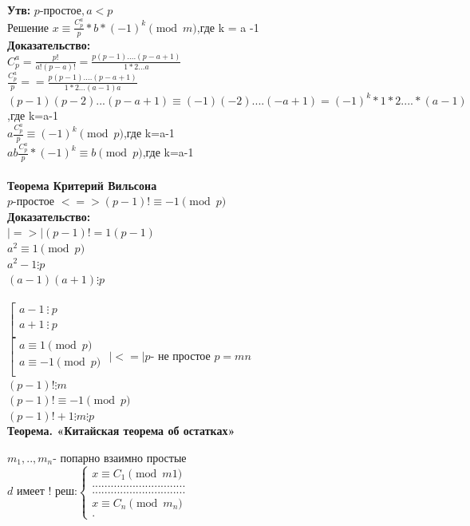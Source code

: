 \documentclass[12pt]{article}
\begin{document}
    \textbf{Утв:}
$p$-простое$ , a<p $\\
    Решение  $x\equiv \frac{C_p^a}{p}*b*(-1)^k \pmod{m}$,где k = a -1\\
    \textbf{Доказательство:}\\
$ C_p^a = \frac{p!}{a!(p-a)!}=\frac{p(p-1)....(p-a+1)}{1*2...a} $\\
$\frac{C_p^a}{p}= =\frac{p(p-1)....(p-a+1)}{1*2...(a-1)a}$\\
$(p-1)(p-2)...(p-a+1)\equiv (-1)(-2)....(-a+1) = (-1)^k*1*2....*(a-1)$,где k=a-1\\
$a\frac{C_p^a}{p}\equiv (-1)^k \pmod{p}$,где k=a-1\\
$ab\frac{C_p^a}{p} * (-1)^k\equiv b \pmod{p} $,где k=a-1\\
    \\
    \textbf{Теорема Критерий Вильсона}
    \\
$p$-простое $<=> (p-1)! \equiv -1 \pmod{p} $\\
    \textbf{Доказательство:}\\
$|=>|  (p-1)!= 1(p-1) $\\
$a^2 \equiv 1 \pmod{p}$\\
$a^2 -1 \vdots p$\\
$(a-1)(a+1) \vdots p$\\
    \\
$\left[ \begin{array}{l}
    a-1 \ \vdots\ p \\
    a+1 \ \vdots\ p \\
\end{array} \right.
$
    \\$\left[ \begin{array}{l}
        a \equiv 1 \pmod{p}  \\
        a \equiv -1 \pmod{p} \\
    \end{array} \right.
$
$|<=| p $- не простое $p = mn$\\
$(p-1)!\vdots m $\\
$(p-1)!\equiv -1 \pmod{p}$\\
$(p-1)!+1\vdots m\vdots p $\\

\textbf{Теорема. «Китайская теорема об остатках»}

$m_1,..,m_n $- попарно взаимно простые \\

$
    d \text{ имеет ! реш:}\left\{
    \begin{aligned}
        x \equiv C_1 \pmod{m1}         \\
        .............................. \\
        .............................. \\
        x \equiv C_n \pmod{m_n}        \\.
    \end{aligned}
    \right.
$\\
\end{document}
